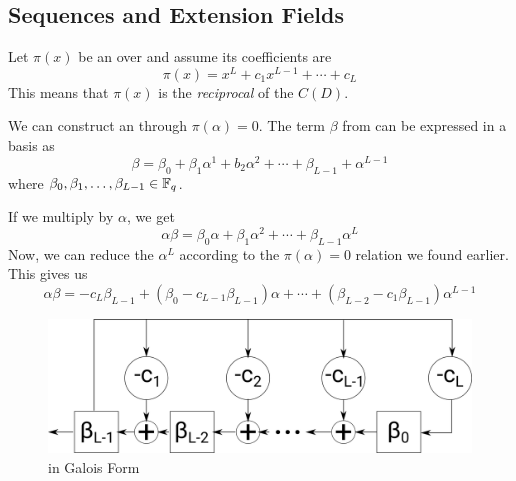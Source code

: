 \subsection{ Sequences and Extension Fields}\label{LFSR_Sequences_Extension_Fields}
Let $\pi(x)$ be an   over  and assume its coefficients are
\begin{equation}\label{eq:Reciprocal_Connection_Polynomial}
  \pi(x) = x^{L} + c_{1}x^{L-1} + \cdots + c_{L}
\end{equation}
This means that $\pi(x)$ is the \emph{reciprocal}  of the  $C(D)$.

We can construct an   through $\pi(\alpha) = 0$.
The term $\beta$ from  can be expressed in a  basis as
\begin{equation}\label{eq:Extension_Field-Beta}
  \beta = \beta_{0} + \beta_{1}\alpha^{1} + b_{2}\alpha^{2} + \cdots + \beta_{L-1} + \alpha^{L-1}
\end{equation}
where $\beta_{0}, \beta_{1}, \ldots, \beta_{L-1} \in \mathbb{F}_{q^{}}$.

If we multiply  by $\alpha$, we get
\begin{equation*}
  \alpha\beta = \beta_{0}\alpha + \beta_{1}\alpha^{2} + \cdots + \beta_{L-1}\alpha^{L}
\end{equation*}
Now, we can reduce the $\alpha^{L}$ according to the $\pi(\alpha)=0$ relation we found earlier.
This gives us
\begin{equation}\label{eq:LFSR_Galois_Equation}
  \alpha\beta = -c_{L}\beta_{L-1} + \left( \beta_{0} - c_{L-1}\beta_{L-1} \right) \alpha + \cdots + \left( \beta_{L-2} - c_{1}\beta_{L-1} \right) \alpha^{L-1}
\end{equation}

\begin{figure}[h!]
  \centering
  \includegraphics[scale=0.5]{./Drawings/EDIN01-Cryptography/Linear_Feedback_Shift_Register-Galois.png}
  \caption{ in Galois Form}
  \label{fig:LFSR_Galois}
\end{figure}

